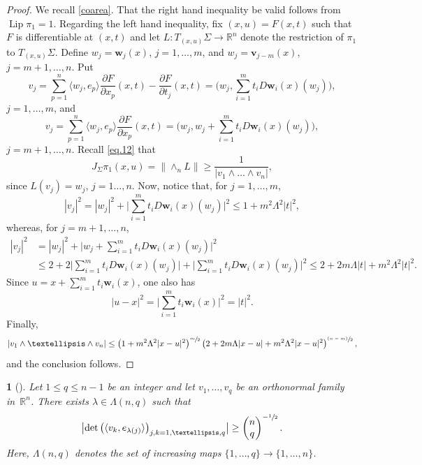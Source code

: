 \documentclass[11pt]{article}
\newcounter{cdrthm}[section]
\theoremstyle{definition}
\theoremstyle{jepanonymous}
\newtheorem{jepempty}[cdrthm]{}
\newenvironment{enonce}[2][remark]{\begin{jepempty}[#2]}{\end{jepempty}}
\theoremstyle{plain}
\newcommand{\psfrac}[2]{\sfrac{(#1)}{#2}}
\newenvironment{Empty}[2][\null]{%
\begin{enonce}[remark]{#1}#2}
{\end{enonce}}
\newcommand{\R}{\mathbb{R}}
\newcommand{\Rn}{\R^n}
\newcommand{\bv}{{\boldsymbol{v}}}
\newcommand{\bw}{{\boldsymbol{w}}}
\DeclareMathOperator{\rmLip}{\mathrm{Lip}}
\newcommand{\bin}[2]{
\begin{pmatrix} #1 \\
#2
\end{pmatrix}}
\let\la\langle
\let\ra\rangle
\begin{document}
\begin{proof}
We recall \ref{coarea}.
That the right hand inequality be valid follows from~\hbox{$\rmLip \pi_1 \!=\! 1$}.
Regarding the left hand inequality, fix $(x,u) = F(x,t)$ such that $F$ is differentiable at $(x,t)$ and let $L: T_{(x,u)}\Sigma \to \R^n$ denote the restriction of $\pi_1$ to $T_{(x,u)}\Sigma$.
Define $w_j = \bw_j(x)$, $j=1,\ldots,m$, and $w_j = \bv_{j-m}(x)$, $j=m+1,\ldots,n$.
Put
\begin{equation*}
v_j = \sum_{p=1}^n \la w_j,e_p \ra\frac{\partial F}{\partial x_p}(x,t) - \frac{\partial F}{\partial t_j}(x,t) = \biggl(w_j,\sum_{i=1}^m t_i D\bw_i(x)(w_j) \biggr),
\end{equation*}
$j=1,\ldots,m$, and
\begin{equation*}
v_j = \sum_{p=1}^n \la w_j,e_p \ra\frac{\partial F}{\partial x_p}(x,t) = \biggl(w_j, w_j +\sum_{i=1}^m t_i D\bw_i(x)(w_j) \biggr),
\end{equation*}
$j=m+1,\ldots,n$.
Recall \eqref{eq.12} that
\begin{equation*}
J_\Sigma \pi_1(x,u) = \|{\wedge}_n L \| \geq \frac{1}{|v_1 \wedge \ldots \wedge v_n|},
\end{equation*}
since $L(v_j)=w_j$, $j=1\ldots,n$.
Now, notice that, for $j=1,\ldots,m$,
\begin{equation*}
\left| v_j\right|^2 = |w_j|^2 + \biggl| \sum_{i=1}^m t_i D \bw_i(x)(w_j)\biggr|^2
\leq 1 + m^2\Lambda^2|t|^2,
\end{equation*}
whereas, for $j=m+1,\ldots,n$,
\begin{align*}
\left| v_j \right|^2 &= |w_j|^2 + \biggl| w_j + \sum_{i=1}^m t_i D \bw_i(x)(w_j)\biggr|^2\\
&\leq 2 + 2 \biggl|\sum_{i=1}^m t_i D \bw_i(x)(w_j) \biggr| + \biggl|\sum_{i=1}^m t_i D \bw_i(x)(w_j) \biggr|^2
\leq 2 + 2 m \Lambda |t| + m^2\Lambda^2|t|^2.
\end{align*}
Since $u = x + \sum_{i=1}^m t_i \bw_i(x)$, one also has
\begin{equation*}
|u-x|^2 = \biggl| \sum_{i=1}^m t_i \bw_i(x) \biggr|^2 = |t|^2.
\end{equation*}
Finally,
\[
|v_1 \wedge \ldots \wedge v_n |
\leq \left(1 + m^2 \Lambda^2 |x-u|^2 \right)^{\sfrac{m}{2}}\left(2 + 2 m \Lambda |x-u| + m^2\Lambda^2|x-u|^2 \right)^{\psfrac{n-m}{2}},
\]
and the conclusion follows.
\end{proof}

\begin{Empty}[]
\label{34}
{\it
Let $1 \leq q \leq n-1$ be an integer and let $v_1,\ldots,v_q$ be an orthonormal family in~$\Rn$. There exists $\lambda \in \Lambda(n,q)$ such that
\begin{equation*}
\bigl| \det \left(\la v_k, e_{\lambda(j)} \ra \right)_{j,k=1,\ldots,q}\bigr| \geq \bin{n}{q}^{-\sfrac{1}{2}}.
\end{equation*}
Here, $\Lambda(n,q)$ denotes the set of increasing maps $\{1,\ldots,q\} \to \{1,\ldots,n\}$.
}
\end{Empty}
\end{document}
